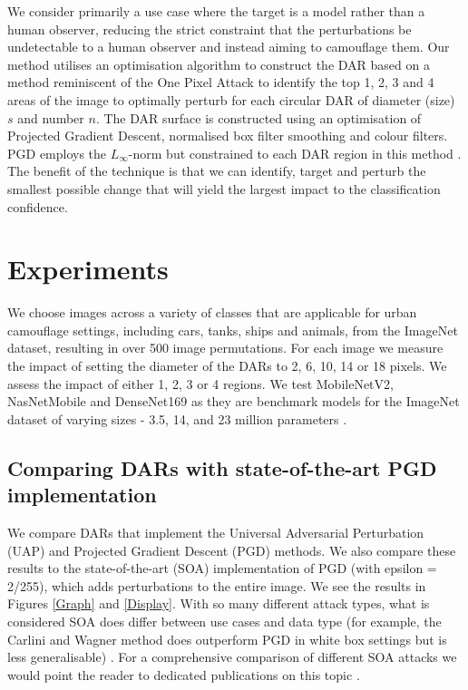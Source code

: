 \documentclass{article}
\begin{document}
We consider primarily a use case where the target is a model rather than a human observer, reducing the strict constraint that the perturbations be undetectable to a human observer and instead aiming to camouflage them. Our method utilises an optimisation algorithm to construct the DAR based on a method reminiscent of the One Pixel Attack to identify the top 1, 2, 3 and 4 areas of the image to optimally perturb for each circular DAR of diameter (size) $s$ and number $n$. The DAR surface is constructed using an optimisation of Projected Gradient Descent, normalised box filter smoothing and colour filters. PGD employs the $L_\infty$-norm but constrained to each DAR region in this method \cite{biggio_wild_2018}. The benefit of the technique is that we can identify, target and perturb the smallest possible change that will yield the largest impact to the classification confidence. 

\section{Experiments} 

We choose images across a variety of classes that are applicable for urban camouflage settings, including cars, tanks, ships and animals, from the ImageNet dataset, resulting in over 500 image permutations. For each image we measure the impact of setting the diameter of the DARs to 2, 6, 10, 14 or 18 pixels. We assess the impact of either 1, 2, 3 or 4 regions. We test MobileNetV2, NasNetMobile and DenseNet169 as they are benchmark models for the ImageNet dataset of varying sizes - 3.5, 14, and 23 million parameters \cite{keras_team_keras_2023}.  

\subsection{Comparing DARs with state-of-the-art PGD implementation}

We compare DARs that implement the Universal Adversarial Perturbation (UAP) and Projected Gradient Descent (PGD) methods.  We also compare these results to the state-of-the-art (SOA) implementation of PGD (with epsilon = 2/255), which adds perturbations to the entire image. We see the results in Figures \ref{Graph} and \ref{Display}. With so many different attack types, what is considered SOA does differ between use cases and data type (for example, the Carlini and Wagner method does outperform PGD in white box settings but is less generalisable) \cite{su_is_2018}. For a comprehensive comparison of different SOA attacks we would point the reader to dedicated publications on this topic \cite{su_is_2018}.
\end{document}
